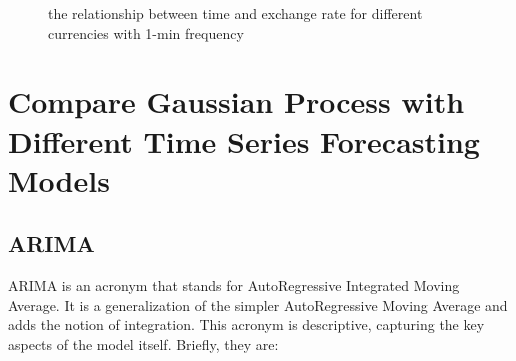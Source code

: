 \documentclass[12pt]{article}
\begin{document}
\begin{figure}[H]

\caption{the relationship between time and exchange rate for different currencies with 1-min frequency}
\end{figure}

\section{Compare Gaussian Process with Different Time Series Forecasting Models}
\subsection{ARIMA}
ARIMA is an acronym that stands for AutoRegressive Integrated Moving Average. It is a generalization of the simpler AutoRegressive Moving Average and adds the notion of integration. This acronym is descriptive, capturing the key aspects of the model itself. Briefly, they are:\\
\end{document}
